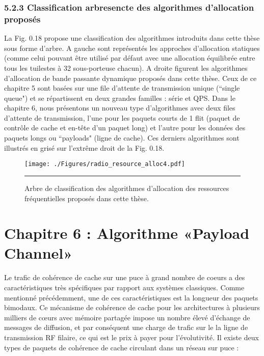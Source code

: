 \newpage
\pagebreak

\subsubsection*{5.2.3 Classification arbresencte des algorithmes d'allocation proposés}

La Fig. 0.18 propose une classification des algorithmes introduits dans cette thèse sous forme d’arbre. A gauche sont représentés les approches d’allocation statiques (comme celui pouvant être utilisé par défaut avec une allocation équilibrée entre tous les tuilestes à 32 sous-porteuse chacun). A droite figurent les algorithmes d’allocation de bande passante dynamique proposés dans cette thèse. Ceux de ce chapitre 5 sont basées sur une file d’attente de transmission unique (``single queue") et se répartissent en deux grandes familles : série et QPS. Dans le chapitre 6, nous présentons un nouveau type d’algorithmes avec deux files d’attente de transmission, l'une pour les paquets courts de 1 flit (paquet de contrôle de cache et en-tête d'un paquet long) et l'autre pour les données des paquets longs ou ``payloads" (ligne de cache). Ces derniers algorithmes sont illustrés en grisé sur  l'extrême droit de la Fig. 0.18. 



\begin{figure}[htbp]
  \centering
    \texttt{[image: ./Figures/radio\_resource\_alloc4.pdf]}
    \rule{35em}{0.5pt}
  \caption[Arbre de classification des algorithmes d'allocation des ressources fréquentielles proposés dans cette thèse.]{Arbre de classification des algorithmes d'allocation des ressources fréquentielles proposés dans cette thèse.} 
  \label{fig:Electron}
\end{figure}


\newpage
\pagebreak

\section*{Chapitre 6 : Algorithme «Payload Channel»}

Le trafic de cohérence de cache sur une puce à grand nombre de coeurs a des caractéristiques très spécifiques par rapport aux systèmes classiques. Comme mentionné précédemment, une de ces caractéristiques est la longueur des paquets bimodaux. Ce mécanisme de cohérence de cache pour les architectures à plusieurs milliers de cœurs avec mémoire partagée impose un nombre élevé d’échange de messages de diffusion, et par conséquent une charge de trafic sur le la ligne de transmission RF filaire, ce qui est le prix à payer pour l'évolutivité. Il existe deux types de paquets de cohérence de cache circulant dans un réseau sur puce : 

